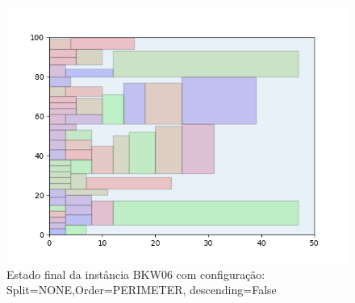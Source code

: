 \begin{figure}[H]
    \centering
    \caption[]{Estado final da instância BKW06 com configuração: Split=NONE,Order=PERIMETER, descending=False}
    \label{fig:bkw06-none-perimeter-false}
    \includegraphics[scale=0.5]{output/figures/bkw/bkw06/none/perimeter/false/00}
\end{figure}
